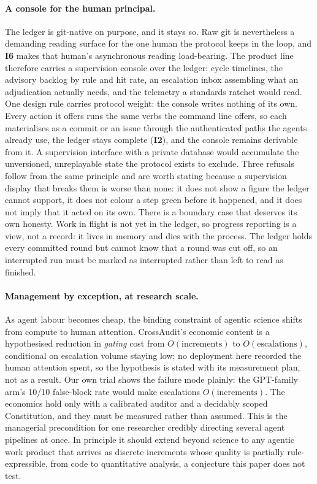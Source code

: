 \documentclass[11pt,letterpaper]{article}
\newcommand{\invariant}[1]{\textbf{I#1}}
\begin{document}
\paragraph{A console for the human principal.} The ledger is git-native on purpose, and it stays so. Raw git is nevertheless a demanding reading surface for the one human the protocol keeps in the loop, and \invariant{6} makes that human's asynchronous reading load-bearing. The product line therefore carries a supervision console over the ledger: cycle timelines, the advisory backlog by rule and hit rate, an escalation inbox assembling what an adjudication actually needs, and the telemetry a standards ratchet would read. One design rule carries protocol weight: the console writes nothing of its own. Every action it offers runs the same verbs the command line offers, so each materialises as a commit or an issue through the authenticated paths the agents already use, the ledger stays complete (\invariant{2}), and the console remains derivable from it. A supervision interface with a private database would accumulate the unversioned, unreplayable state the protocol exists to exclude. Three refusals follow from the same principle and are worth stating because a supervision display that breaks them is worse than none: it does not show a figure the ledger cannot support, it does not colour a step green before it happened, and it does not imply that it acted on its own. There is a boundary case that deserves its own honesty. Work in flight is not yet in the ledger, so progress reporting is a view, not a record: it lives in memory and dies with the process. The ledger holds every committed round but cannot know that a round was cut off, so an interrupted run must be marked as interrupted rather than left to read as finished.

\paragraph{Management by exception, at research scale.} As agent labour becomes cheap, the binding constraint of agentic science shifts from compute to human attention. CrossAudit's economic content is a hypothesised reduction in \emph{gating} cost from $O(\text{increments})$ to $O(\text{escalations})$, conditional on escalation volume staying low; no deployment here recorded the human attention spent, so the hypothesis is stated with its measurement plan, not as a result. Our own trial shows the failure mode plainly: the GPT-family arm's 10/10 false-block rate would make escalations $O(\text{increments})$. The economics hold only with a calibrated auditor and a decidably scoped Constitution, and they must be measured rather than assumed. This is the managerial precondition for one researcher credibly directing several agent pipelines at once. In principle it should extend beyond science to any agentic work product that arrives as discrete increments whose quality is partially rule-expressible, from code to quantitative analysis, a conjecture this paper does not test.
\end{document}
